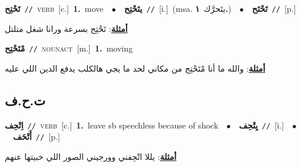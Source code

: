 \documentclass[10pt,a4paper,twoside]{article} %
\begin{document}
\begin{multicols}{2}
{{{\setlength\topsep{0pt}\textbf{\foreignlanguage{arabic}{تَحْتِح}}\ {\color{gray}\texttt{//}\color{black}}\ \textsc{verb}\ [c.]\ \textbf{1.}~move\ \ $\bullet$\ \ \setlength\topsep{0pt}\textbf{\foreignlanguage{arabic}{يتَحْتِح}}\ {\color{gray}\texttt{//}\color{black}}\ [i.]\ \color{gray}(msa. \foreignlanguage{arabic}{يتَحرَّك}~\foreignlanguage{arabic}{\textbf{١.}})\color{black}\ \ $\bullet$\ \ \setlength\topsep{0pt}\textbf{\foreignlanguage{arabic}{تَحْتَح}}\ {\color{gray}\texttt{//}\color{black}}\ [p.]\  \begin{flushright}\color{gray}\foreignlanguage{arabic}{\textbf{\underline{\foreignlanguage{arabic}{أمثلة}}}: تَحْتِح بسرعة ورانا شغل متلتل}\end{flushright}\color{black}} \vspace{2mm}

{\setlength\topsep{0pt}\textbf{\foreignlanguage{arabic}{مْتَحْتِح}}\ {\color{gray}\texttt{//}\color{black}}\ \textsc{noun\textunderscore act}\ [m.]\ \textbf{1.}~moving\  \begin{flushright}\color{gray}\foreignlanguage{arabic}{\textbf{\underline{\foreignlanguage{arabic}{أمثلة}}}: والله ما أنا مْتَحْتِح من مكاني لحد ما يجي هالكلب يدفع الدين اللي عليه}\end{flushright}\color{black}} \vspace{2mm}

\vspace{-3mm}
\subsection*{\color{blue}\foreignlanguage{arabic}{ت.ح.ف}\color{blue}{}} 

{\setlength\topsep{0pt}\textbf{\foreignlanguage{arabic}{اِتْحِف}}\ {\color{gray}\texttt{//}\color{black}}\ \textsc{verb}\ [c.]\ \textbf{1.}~leave sb speechless because of shock\ \ $\bullet$\ \ \setlength\topsep{0pt}\textbf{\foreignlanguage{arabic}{يِتْحِف}}\ {\color{gray}\texttt{//}\color{black}}\ [i.]\ \ $\bullet$\ \ \setlength\topsep{0pt}\textbf{\foreignlanguage{arabic}{أَتْحَف}}\ {\color{gray}\texttt{//}\color{black}}\ [p.]\  \begin{flushright}\color{gray}\foreignlanguage{arabic}{\textbf{\underline{\foreignlanguage{arabic}{أمثلة}}}: يللا اتْحِفني وورجيني الصور اللي خبيتها عنهم}\end{flushright}\color{black}} \vspace{2mm}

}}
\end{multicols}
\end{document}
